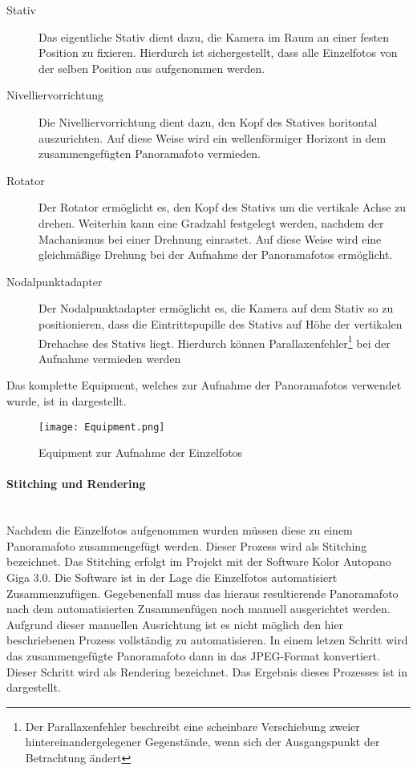 \begin{description}
\item[Stativ] Das eigentliche Stativ dient dazu, die Kamera im Raum an einer
festen Position zu fixieren. Hierdurch ist sichergestellt, dass alle
Einzelfotos von der selben Position aus aufgenommen werden.
\item[Nivelliervorrichtung] Die Nivelliervorrichtung dient dazu, den Kopf des
Statives horitontal auszurichten. Auf diese Weise wird ein wellenförmiger
Horizont in dem zusammengefügten Panoramafoto vermieden.
\item[Rotator] Der Rotator ermöglicht es, den Kopf des Stativs um die vertikale
Achse zu drehen. Weiterhin kann eine Gradzahl festgelegt werden, nachdem der
Machanismus bei einer Drehnung einrastet. Auf diese Weise wird eine gleichmäßige
Drehung bei der Aufnahme der Panoramafotos ermöglicht.
\item[Nodalpunktadapter] Der Nodalpunktadapter ermöglicht es, die Kamera auf
dem Stativ so zu positionieren, dass die Eintrittspupille des Stativs auf Höhe
der vertikalen Drehachse des Stativs liegt. Hierdurch können
Parallaxenfehler\footnote{Der Parallaxenfehler beschreibt eine scheinbare
Verschiebung zweier hintereinandergelegener Gegenstände, wenn sich der
Ausgangspunkt der Betrachtung ändert} bei der Aufnahme vermieden werden
\end{description}

Das komplette Equipment, welches zur Aufnahme der Panoramafotos verwendet wurde,
ist in  dargestellt.

\begin{figure}[htb]
\centering
\texttt{[image: Equipment.png]}
\caption[Equipment zur Aufnahme der Einzelfotos]{Equipment zur Aufnahme der Einzelfotos\protect\footnotemark}
\label{fig:Equipment}
\end{figure}

\paragraph{Stitching und Rendering} \hfill \\

Nachdem die Einzelfotos aufgenommen wurden müssen diese zu einem Panoramafoto
zusammengefügt werden. Dieser Prozess wird als Stitching bezeichnet. Das
Stitching erfolgt im Projekt mit der Software Kolor Autopano Giga 3.0. Die
Software ist in der Lage die Einzelfotos automatisiert Zusammenzufügen.
Gegebenenfall muss das hieraus resultierende Panoramafoto nach dem
automatisierten Zusammenfügen noch manuell ausgerichtet werden. Aufgrund
dieser manuellen Ausrichtung ist es nicht möglich den hier beschriebenen
Prozess vollständig zu automatisieren. In einem letzen Schritt wird das
zusammengefügte Panoramafoto dann in das JPEG-Format konvertiert. Dieser Schritt
wird als Rendering bezeichnet. Das Ergebnis dieses Prozesses ist in
 dargestellt.

